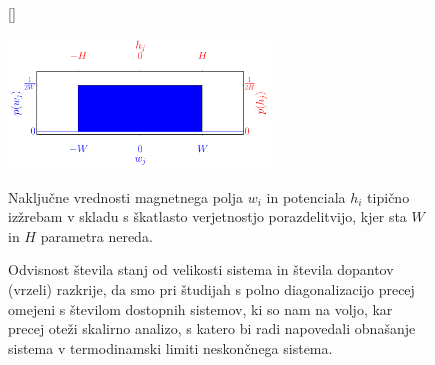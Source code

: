 \begin{figure}[H]
[\FBwidth]
{\caption{Naključne vrednosti magnetnega polja $w_i$ in potenciala $h_i$ tipično izžrebam v skladu s škatlasto verjetnostjo porazdelitvijo, kjer sta $W$ in $H$ parametra nereda. }\label{fig:prob_dist}}
{\includegraphics[width=0.62\textwidth]{prob_dist.pdf}}
\end{figure}
\begin{figure}[H]
\caption{Odvisnost števila stanj od velikosti sistema in števila dopantov (vrzeli) razkrije, da smo pri študijah s polno diagonalizacijo precej omejeni s številom dostopnih sistemov, ki so nam na voljo, kar precej oteži skalirno analizo, s katero bi radi napovedali obnašanje sistema v termodinamski limiti neskončnega sistema.}
\label{fig:tJ_num_states}
\end{figure}
\newpage

